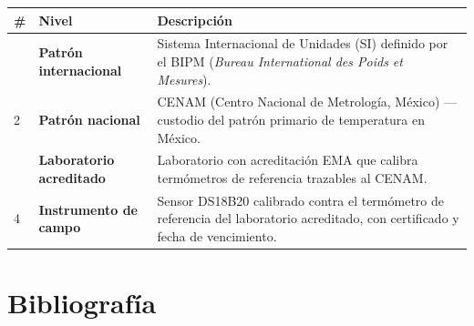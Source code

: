 \vspace{6pt}
\begin{center}
\renewcommand{\arraystretch}{1.6}
\begin{tabular}{>{\centering}m{0.5cm}
                >{\bfseries\centering}m{3.8cm}
                >{\raggedright\arraybackslash}m{8cm}}
\toprule
\rowcolor{azulprin}
\color{white}\textbf{\#} &
\color{white}\textbf{Nivel} &
\color{white}\textbf{Descripci\'on} \\
\midrule
1 & Patr\'on internacional &
Sistema Internacional de Unidades (SI) definido por el BIPM
(\textit{Bureau International des Poids et Mesures}). \\
\rowcolor{grisclaro}
2 & Patr\'on nacional &
CENAM (Centro Nacional de Metrolog\'ia, M\'exico) --- custodio del patr\'on
primario de temperatura en M\'exico. \\
3 & Laboratorio acreditado &
Laboratorio con acreditaci\'on EMA que calibra term\'ometros de referencia
trazables al CENAM. \\
\rowcolor{grisclaro}
4 & Instrumento de campo &
Sensor DS18B20 calibrado contra el term\'ometro de referencia del laboratorio
acreditado, con certificado y fecha de vencimiento. \\
\bottomrule
\end{tabular}
\end{center}


\newpage
{}
\section*{Bibliograf\'ia}

